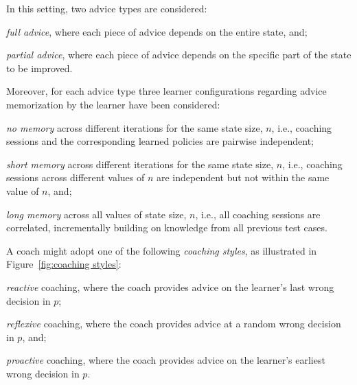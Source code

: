 \documentclass[a4paper,twoside]{article}
\begin{document}
In this setting, two advice types are considered:
\begin{enumerate*}[label=(A\arabic*)]
	\item \emph{full advice}, where each piece of advice depends on the entire state, and;
	\item \emph{partial advice}, where each piece of advice depends on the specific part of the state to be improved.
\end{enumerate*}
Moreover, for each advice type three learner configurations regarding advice memorization by the learner have been considered:
\begin{enumerate*}[label=(M\arabic*)]
	\item \emph{no memory} across different iterations for the same state size, $n$, i.e., coaching sessions and the corresponding learned policies are pairwise independent;
	\item \emph{short memory} across different iterations for the same state size, $n$, i.e., coaching sessions across different values of $n$ are independent but not within the same value of $n$, and;
	\item \emph{long memory} across all values of state size, $n$, i.e., all coaching sessions are correlated, incrementally building on knowledge from all previous test cases.
\end{enumerate*}
A coach might adopt one of the following \emph{coaching styles}, as illustrated in Figure~\ref{fig:coaching styles}:
\begin{enumerate*}[label=(C\arabic*)]
	\item \emph{reactive} coaching, where the coach provides advice on the learner's last wrong decision in $p$;
	\item \emph{reflexive} coaching, where the coach provides advice at a random wrong decision in $p$, and;
	\item \emph{proactive} coaching, where the coach provides advice on the learner's earliest wrong decision in $p$.
\end{enumerate*}
\end{document}
